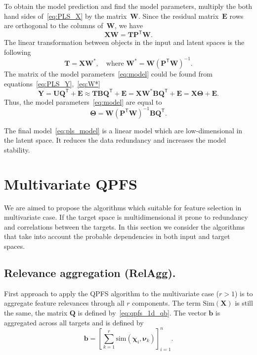 \documentclass[12pt,twoside]{article}
\theoremstyle{definition}
\newcommand{\bb}{\mathbf{b}}
\newcommand{\bY}{\mathbf{Y}}
\newcommand{\bX}{\mathbf{X}}
\newcommand{\bP}{\mathbf{P}}
\newcommand{\bT}{\mathbf{T}}
\newcommand{\bB}{\mathbf{B}}
\newcommand{\bQ}{\mathbf{Q}}
\newcommand{\bE}{\mathbf{E}}
\newcommand{\bU}{\mathbf{U}}
\newcommand{\bW}{\mathbf{W}}
\newcommand{\T}{\mathsf{T}}
\newcommand{\bchi}{\boldsymbol{\chi}}
\newcommand{\bnu}{\boldsymbol{\nu}}
\newcommand{\bTheta}{\boldsymbol{\Theta}}
\begin{document}
To obtain the model prediction and find the model parameters, multiply the both hand sides of~\eqref{eq:PLS_X} by the matrix~$\bW$. 
Since the residual matrix~$\bE$ rows are orthogonal to the columns of~$\bW$, we have
\begin{equation*}
\bX \bW = \bT \bP^{\T} \bW.
\end{equation*}
The linear transformation between objects in the input and latent spaces is the following
\begin{equation}
\bT = \bX \bW^*, \quad \text{where } \bW^* = \bW (\bP^{\T} \bW)^{-1}.
\label{eq:W*}
\end{equation}
The matrix of the model parameters~\eqref{eq:model} could be found from equations~\eqref{eq:PLS_Y},~\eqref{eq:W*}
\begin{equation}
\bY = \bU \bQ^{\T} + \bE \approx \bT \bB \bQ^{\T}+ \bE = \bX \bW^* \bB \bQ^{\T} + \bE = \bX \bTheta + \bE.
\label{eq:pls_model}
\end{equation}
Thus, the model parameters~\eqref{eq:model} are equal to
\begin{equation}
\bTheta = \bW (\bP^{\T} \bW)^{-1} \bB \bQ^{\T}.
\label{eq:model_parameters}
\end{equation}

The final model~\eqref{eq:pls_model} is a linear model which are low-dimensional in the latent space. 
It reduces the data redundancy and increases the model stability. 

\section{Multivariate QPFS}

We are aimed to propose the algorithms which suitable for feature selection in multivariate case. 
If the target space is multidimensional it prone to redundancy and correlations between the targets. 
In this section we consider the algorithms that take into account the probable dependencies in both input and target spaces.

\subsection{Relevance aggregation (RelAgg).}

First approach to apply the QPFS algorithm to the multivariate case ($r > 1$) is to aggregate feature relevances through all $r$ components. The term $\text{Sim}(\bX)$ is still the same, the matrix $\bQ$ is defined by~\eqref{eq:qpfs_1d_qb}. The vector $\bb$ is aggregated across all targets and is defined by
\begin{equation*}
\bb = \left[\sum_{k=1}^r\text{sim}(\bchi_i, \bnu_k)\right]_{i=1}^n.
\end{equation*}
\end{document}
